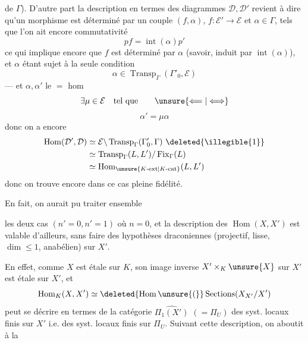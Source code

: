 de $\Gamma$).
D'autre part la description en termes des diagrammes $\mathcal D,\mathcal D'$ revient à dire qu'un morphisme est déterminé par un couple $(f,\alpha)$, $f:\mathcal E'\longrightarrow\mathcal E$ et $\alpha\in\Gamma$, tels que l'on ait encore commutativité
\[
pf=\operatorname{int}(\alpha)p'
\]
ce qui implique encore que $f$ est déterminé par $\alpha$ (savoir, induit par $\operatorname{int}(\alpha)$), et $\alpha$ étant sujet à la seule condition
\[
\alpha\in\operatorname{Transp}_{\Gamma}(\Gamma'_0,\mathcal E)
\]
--- et $\alpha,\alpha'$  le $=$ hom 
\[
\exists\mu\in\mathcal E\quad\text{tel que}\qquad\unsure{\Longleftarrow|\Longleftrightarrow}
\]
\[
\alpha'=\mu\alpha
\]
donc on a encore
\[
\begin{aligned}
\operatorname{Hom}(\mathcal D',\mathcal D)
&\simeq\mathcal E\backslash\operatorname{Transp}_{\Gamma}(\Gamma'_0,\Gamma)\ \deleted{\illegible{1}}\\
&\simeq\operatorname{Transp}_{\Gamma}(L,L')/\operatorname{Fix}_{\Gamma}(L)\\
&\simeq\operatorname{Hom}_{\unsure{K\text{-}\mathrm{ext}|K\text{-}\mathrm{cat}}}(L,L')
\end{aligned}
\]
donc on trouve encore dans ce cas  pleine fidélité.

En fait, on aurait pu traiter ensemble

les deux cas $(n'=0,n'=1)$ où $n=0$, et la description des $\operatorname{Hom}(X,X')$  est valable d'ailleurs, sans  faire des hypothèses draconiennes (projectif, lisse, $\dim\leq1$, anabélien) sur $X'$.

En effet, comme $X$ est  étale sur $K$, son image inverse   $X'\times_K\unsure{X}$ sur $X'$ est  étale sur $X'$, et
\[
\operatorname{Hom}_K(X,X')\simeq\deleted{\operatorname{Hom}\unsure{(}}\operatorname{Sections}(X_{X'}/X')
\]
peut se décrire en termes de la catégorie $\widehat{\Pi_1(X')}$ $(=\Pi_U)$ des syst. locaux finis sur $X'$ i.e. des syst. locaux finis sur $\Pi_U$.
Suivant cette description, on aboutit à la

